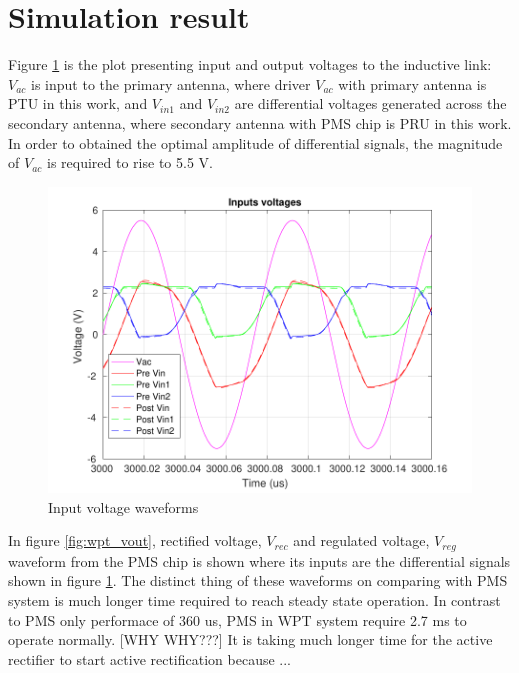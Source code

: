 \documentclass[12pt,a4paper,UKenglish]{article}
\begin{document}
\section{Simulation result}
Figure \ref{fig:wpt_vin} is the plot presenting input and output voltages to the inductive link: $V_{ac}$ is input to the primary antenna, where driver $V_{ac}$ with primary antenna is PTU in this work, and $V_{in1}$ and $V_{in2}$ are differential voltages generated across the secondary antenna, where secondary antenna with PMS chip is PRU in this work. In order to obtained the optimal amplitude of differential signals, the magnitude of $V_{ac}$ is required to rise to 5.5 \si{\volt}. \\

\begin{figure} [H]
  \centering
  \includegraphics[width=\textwidth]{img/wpt_inputs_both.pdf} 
 \caption{Input voltage waveforms} 
\label{fig:wpt_vin} 
\end{figure}

In figure \ref{fig:wpt_vout}, rectified voltage, $V_{rec}$ and regulated voltage, $V_{reg}$ waveform from the PMS chip is shown where its inputs are the differential signals shown in figure \ref{fig:wpt_vin}. The distinct thing of these waveforms on comparing with PMS system is much longer time required to reach steady state operation. In contrast to 
PMS only performace of 360 us, PMS in WPT system require 2.7 ms to operate normally. [WHY WHY???] It is taking much longer time for the active rectifier to start active rectification because ...\\
\end{document}
